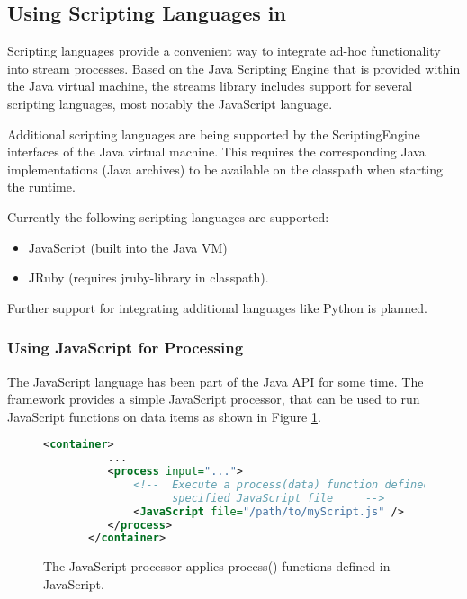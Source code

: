 \subsection{\label{sec:scripting}Using Scripting Languages in \streams}
Scripting languages provide a convenient way to integrate ad-hoc
functionality into stream processes. Based on the Java Scripting
Engine that is provided within the Java virtual machine, the streams
library includes support for several scripting languages, most notably
the JavaScript language.

Additional scripting languages are being supported by the
ScriptingEngine interfaces of the Java virtual machine. This requires
the corresponding Java implementations (Java archives) to be available
on the classpath when starting the \streams runtime.

Currently the following scripting languages are supported:

\begin{itemize}
   \item JavaScript (built into the Java VM)
   \item JRuby (requires jruby-library in classpath).
\end{itemize}

Further support for integrating additional languages like Python is
planned.


\subsubsection{\label{sec:javascript}Using JavaScript for Processing}
The JavaScript language has been part of the Java API for some
time. The \streams framework provides a simple {\ttfamily JavaScript}
processor, that can be used to run JavaScript functions on data items
as shown in Figure \ref{fig:javascriptExample}.

\begin{figure}[h!]
  \centering
  \begin{lstlisting}[language=XML]
       <container>
          ...
          <process input="...">
              <!--  Execute a process(data) function defined in the
                    specified JavaScript file     -->
              <JavaScript file="/path/to/myScript.js" />
          </process>
       </container>
  \end{lstlisting}
  \caption{\label{fig:javascriptExample}The {\ttfamily JavaScript} processor applies process() functions defined in JavaScript.}
\end{figure}


